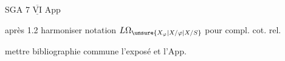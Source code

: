 SGA 7 $\underline{\overline{\mathrm{VI}}}$ App

après 1.2 harmoniser notation $L\Omega_{\unsure{X_{\varphi}|X/\varphi|X/S}}$ pour compl. cot. rel.

mettre bibliographie commune  l'exposé et l'App.

